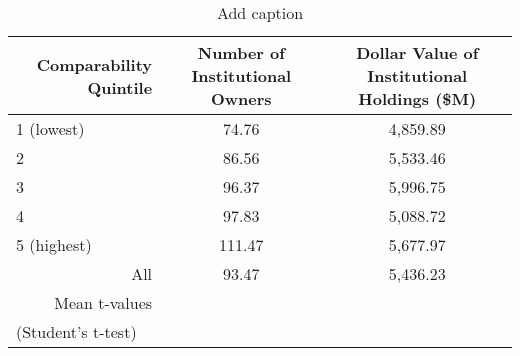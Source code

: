 \begin{table}[htbp]
  \centering
  \caption{Add caption}
    \begin{tabular}{rrr}
    \toprule
    Comparability Quintile & \multicolumn{1}{c}{Number of Institutional Owners} & \multicolumn{1}{c}{Dollar Value of Institutional Holdings (\$M)} \\
    \midrule
    \multicolumn{1}{l}{1 (lowest)} & \multicolumn{1}{c}{74.76} & \multicolumn{1}{c}{4,859.89} \\
    \multicolumn{1}{l}{2} & \multicolumn{1}{c}{86.56} & \multicolumn{1}{c}{5,533.46} \\
    \multicolumn{1}{l}{3} & \multicolumn{1}{c}{96.37} & \multicolumn{1}{c}{5,996.75} \\
    \multicolumn{1}{l}{4} & \multicolumn{1}{c}{97.83} & \multicolumn{1}{c}{5,088.72} \\
    \multicolumn{1}{l}{5 (highest)} & \multicolumn{1}{c}{111.47} & \multicolumn{1}{c}{5,677.97} \\
    All   & \multicolumn{1}{c}{93.47} & \multicolumn{1}{c}{5,436.23} \\
    Mean t-values &       &  \\
    \multicolumn{1}{l}{(Student's t-test)} &       &  \\
    \bottomrule
    \end{tabular}%
  \label{tab:addlabel}%
\end{table}%
